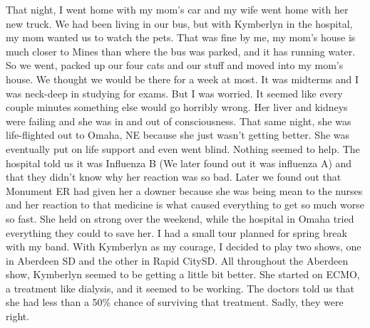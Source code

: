 \documentclass[12pt, letterpaper]{article}
\begin{document}
That night, I went home with my mom's car and my wife went home with her new truck.
We had been living in our bus, but with Kymberlyn in the hospital, my mom wanted us to watch the pets.
That was fine by me, my mom's house is much closer to Mines than where the bus was parked, and it has 
running water.
So we went, packed up our four cats and our stuff and moved into my mom's house. 
We thought we would be there for a week at most.
It was midterms and I was neck-deep in studying for exams.
But I was worried.
It seemed like every couple minutes something else would go horribly wrong.
Her liver and kidneys were failing and she was in and out of consciousness.
That same night, she was life-flighted out to Omaha, NE because she just wasn't getting better.
She was eventually put on life support and even went blind.
Nothing seemed to help. 
The hospital told us it was Influenza B (We later found out it was influenza A) and that
they didn't know why her reaction was so bad.
Later we found out that Monument ER had given her a downer because she was being mean to the 
nurses and her reaction to that medicine is what caused everything to get so much worse so fast.
She held on strong over the weekend, while the hospital in Omaha tried everything they could to 
save her.
I had a small tour planned for spring break with my band.
With Kymberlyn as my courage, I decided to play two shows, one in Aberdeen SD and the other
in Rapid City\@ SD\@.
All throughout the Aberdeen show, Kymberlyn seemed to be getting a little bit better. 
She started on ECMO, a treatment like dialysis, and it seemed to be working.
The doctors told us that she had less than a 50\% chance of surviving that treatment.
Sadly, they were right.
\end{document}
